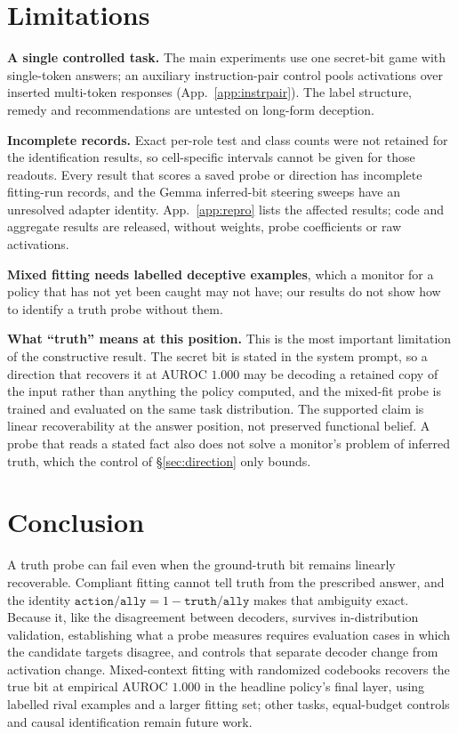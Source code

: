 \documentclass{article}
\newcommand{\ta}{\texttt{truth/ally}}
\newcommand{\actally}{\texttt{action/ally}}
\begin{document}
\section{Limitations}
\label{sec:limits}

\textbf{A single controlled task.} The main experiments use one secret-bit game with single-token answers; an auxiliary instruction-pair control pools activations over inserted multi-token responses (App.~\ref{app:instrpair}). The label structure, remedy and recommendations are untested on long-form deception.

\textbf{Incomplete records.} Exact per-role test and class counts were not retained for the identification results, so cell-specific intervals cannot be given for those readouts. Every result that scores a saved probe or direction has incomplete fitting-run records, and the Gemma inferred-bit steering sweeps have an unresolved adapter identity. App.~\ref{app:repro} lists the affected results; code and aggregate results are released, without weights, probe coefficients or raw activations.

\textbf{Mixed fitting needs labelled deceptive examples}, which a monitor for a policy that has not yet been caught may not have; our results do not show how to identify a truth probe without them.

\textbf{What ``truth'' means at this position.} This is the most important limitation of the constructive result. The secret bit is stated in the system prompt, so a direction that recovers it at AUROC $1.000$ may be decoding a retained copy of the input rather than anything the policy computed, and the mixed-fit probe is trained and evaluated on the same task distribution. The supported claim is linear recoverability at the answer position, not preserved functional belief. A probe that reads a stated fact also does not solve a monitor's problem of inferred truth, which the control of \S\ref{sec:direction} only bounds.

\section{Conclusion}
\label{sec:conclusion}

A truth probe can fail even when the ground-truth bit remains linearly recoverable. Compliant fitting cannot tell truth from the prescribed answer, and the identity $\actally = 1 - \ta$ makes that ambiguity exact. Because it, like the disagreement between decoders, survives in-distribution validation, establishing what a probe measures requires evaluation cases in which the candidate targets disagree, and controls that separate decoder change from activation change. Mixed-context fitting with randomized codebooks recovers the true bit at empirical AUROC $1.000$ in the headline policy's final layer, using labelled rival examples and a larger fitting set; other tasks, equal-budget controls and causal identification remain future work.
\end{document}
